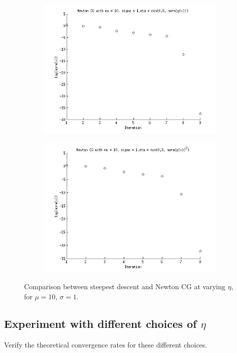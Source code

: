 \documentclass{article}
\begin{document}
\begin{figure}[!htb]
\begin{subfigure}[bh]{0.45\textwidth}
                \includegraphics[width=\textwidth]{figs/P3NCGmu10sig1eta2.jpg}
        \end{subfigure}%
        \begin{subfigure}[bh]{0.45\textwidth}
                \includegraphics[width=\textwidth]{figs/P3NCGmu10sig1eta3.jpg}
        \end{subfigure}
        \caption{Comparison between steepest descent and Newton CG at
 varying $\eta$, for $\mu=10$, $\sigma=1$.}
\end{figure}


\subsection{Experiment with different choices of $\eta$}

Verify the theoretical convergence rates for these different choices. 
\end{document}
